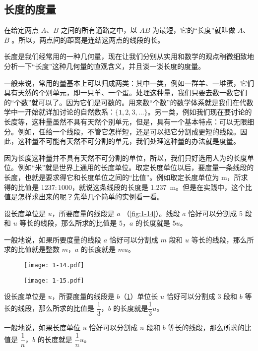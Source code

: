 \subsection{长度的度量}
在给定两点 $A$、$B$ 之间的所有通路之中，以 $AB$ 为最短，它的“长度”就叫做 $A$、$B$ 。所以，两点间的距离是连结这两点的线段的长。

长度是我们经常用的一种几何量，现在让我们分别从实用和数学的观点稍微细致地分析一下“长度”这种几何量的直观含义，并且谈一谈长度的度量。

一般来说，常用的量基本上可以归成两类：其中一类，例如一群羊、一堆蛋，它们具有天然的个别单元，即一只羊、一个蛋。处理这种量，我们只要去数一数它们的“个数”就可以了。因为它们是可数的。用来数“个数”的数学体系就是我们在代数学中一开始就详加讨论的自然数系：$\{1,2,3,\ldots\}$。另一类，例如我们现在要讨论的长度等，这种量虽然不具有天然个别单元，但是，具有一个基本特点：可以无限细分。例如，任给一个线段，不管它怎样短，还是可以把它分割成更短的线段。因此，这种量不可能有天然不可分割的单元，我们处理这种量的办法就是度量。

因为长度这种量并不具有天然不可分割的单位，所以，我们只好选用人为的长度单位。例如“米”就是世界上通用的长度单位。取定长度单位以后，要度量一条线段的长度，也就是要求得它和长度单位之间的“比值”。例如取定长度单位为 \unit{m}，所求得的比值是 $1237:1000$，就说这条线段的长度是 \qty{1.237}{m}。但是在实践中，这个比值是怎样求出来的呢？先举几个简单的实例看一看。

\begin{example}\label{exp:divide_mult}
设长度单位是 $u$，所要度量的线段是 $a$ （\cref{fig:1-14}）。线段 $a$ 恰好可以分割成 5 段和 $u$ 等长的线段，那么所求的比值是 5，$a$ 的长度就是 $5u$。

一般地说，如果所要度量的线段 $a$ 恰好可以分割成 $m$ 段和 $u$ 等长的线段，那么所求的比值就是整数 $m$，$a$ 的长度就是 $mu$。
\end{example}

\begin{figure}
  \begin{minipage}[b]{0.48\linewidth}
    \centering
		\texttt{[image: 1-14.pdf]}
    \caption{}\label{fig:1-14}
	\end{minipage}
	\begin{minipage}[b]{0.48\linewidth}
    \centering
    \texttt{[image: 1-15.pdf]}
    \caption{}\label{fig:1-15}
	\end{minipage}
\end{figure}

\begin{example}\label{exp:divide_fraction}
设长度单位是 $u$，所要度量的线段是 $b$（\cref{fig:1-15}）单位长 $u$ 恰好可以分割成 3 段和 $b$ 等长的线段，那么所求的比值是 $\dfrac{1}{3}$，$b$ 的长度就是$\dfrac{1}{3}u$。

\bigskip
一般地说，如果长度单位 $u$ 恰好可以分割成 $n$ 段和 $b$ 等长的线段，那么所求的比值是 $\dfrac{1}{n}$，$b$ 的长度就是 $\dfrac{1}{n}u$。
\end{example}

